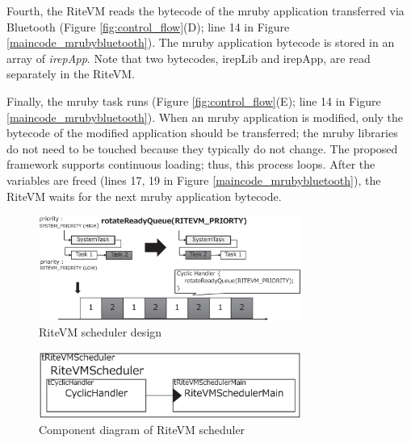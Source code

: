 \documentclass[conference]{IEEEtran/IEEEtran/IEEEtran}
\begin{document}
Fourth, the RiteVM reads the bytecode of the mruby application transferred via Bluetooth (Figure \ref{fig:control_flow}(D); line 14 in Figure \ref{maincode_mrubybluetooth}).
The mruby application bytecode is stored in an array of {\it irepApp}.
Note that two bytecodes, irepLib and irepApp, are read separately in the RiteVM.

Finally, the mruby task runs (Figure \ref{fig:control_flow}(E); line 14 in Figure \ref{maincode_mrubybluetooth}).
When an mruby application is modified, only the bytecode of the modified application should be transferred; the mruby libraries do not need to be touched because they typically do not change.
The proposed framework supports continuous loading; thus, this process loops.
After the variables are freed (lines 17, 19 in Figure \ref{maincode_mrubybluetooth}), the RiteVM waits for the next mruby application bytecode.

\begin{figure}[t]
    \centering
    \includegraphics[width=8.6cm,clip]{figure/rotateReadyQueue.eps}
    \vspace{-3mm}
\caption{RiteVM scheduler design}
    \vspace{-3mm}
\label{fig:rotateReadyQueue}
\end{figure} 

\begin{figure}[t]
    \centering
    \includegraphics[width=8.6cm,clip]{figure/cyclic_handler.eps}
    \vspace{-3mm}
\caption{Component diagram of RiteVM scheduler}
    \vspace{-3mm}
\label{fig:cyclic_handler}
\end{figure}
\end{document}
